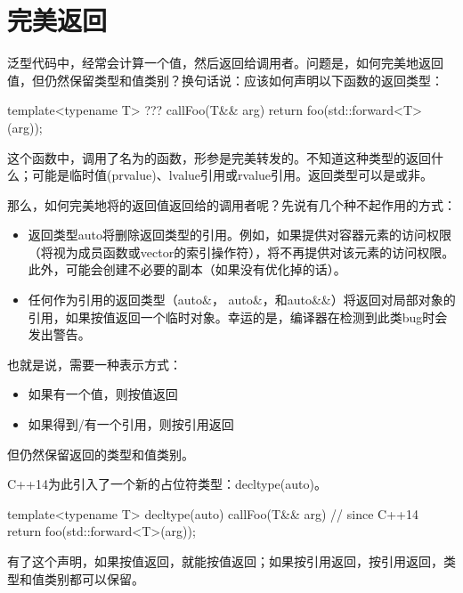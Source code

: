 \section{完美返回}
泛型代码中，经常会计算一个值，然后返回给调用者。问题是，如何完美地返回值，但仍然保留类型和值类别？换句话说：应该如何声明以下函数的返回类型：

\begin{cppcode}
template<typename T>
??? callFoo(T&& arg)
{
	return foo(std::forward<T>(arg));
}
\end{cppcode}

这个函数中，调用了名为的函数，形参是完美转发的。不知道这种类型的返回什么；可能是临时值(prvalue)、lvalue引用或rvalue引用。返回类型可以是或非。

那么，如何完美地将的返回值返回给的调用者呢？先说有几个种不起作用的方式：

\begin{itemize}
	\item 返回类型auto将删除返回类型的引用。例如，如果提供对容器元素的访问权限（将视为成员函数或vector的索引操作符），将不再提供对该元素的访问权限。此外，可能会创建不必要的副本（如果没有优化掉的话）。
	\item 任何作为引用的返回类型（auto\&，  auto\&，和auto\&\&）将返回对局部对象的引用，如果按值返回一个临时对象。幸运的是，编译器在检测到此类bug时会发出警告。
\end{itemize}

也就是说，需要一种表示方式：

\begin{itemize}
	\item 如果有一个值，则按值返回
	\item 如果得到/有一个引用，则按引用返回
\end{itemize}

但仍然保留返回的类型和值类别。

C++14为此引入了一个新的占位符类型：decltype(auto)。

\begin{cppcode}
template<typename T>
decltype(auto) callFoo(T&& arg) // since C++14
{
	return foo(std::forward<T>(arg));
}
\end{cppcode}

有了这个声明，如果按值返回，就能按值返回；如果按引用返回，按引用返回，类型和值类别都可以保留。











































